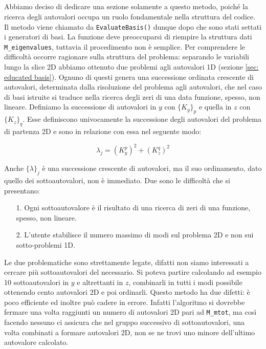 \subsection{}
 Abbiamo deciso di dedicare una sezione solamente a questo metodo, poich\'e la ricerca degli autovalori occupa un ruolo fondamentale nella 
struttura del codice.
 Il metodo viene chiamato da \texttt{EvaluateBasis()} dunque dopo che sono stati settati i generatori di basi. La funzione deve preoccuparsi di 
riempire la struttura dati \texttt{M\_eigenvalues}, tuttavia il procedimento non \`e semplice. 
 Per comprendere le difficolt\`a occorre ragionare sulla struttura del problema: separando le variabili lungo la slice 2D abbiamo ottenuto due 
problemi agli autovalori 1D (sezione \ref{sec: educated basis}). Ognuno di questi genera una successione ordinata crescente di autovalori, 
determinata dalla risoluzione del problema agli autovalori, che nel caso di basi istruite si traduce nella ricerca degli zeri di una data 
funzione, spesso, non lineare. Definiamo la successione di autovalori in $y$ con $\{K_y\}_p$ e quella in $z$ con $\{K_z\}_q$. Esse 
definiscono univocamente la successione degli autovalori del problema di partenza 2D e sono in relazione con essa nel seguente modo:

\begin{equation}
\label{eq: autovalori}
 \lambda_j = (K_y^p)^2 + (K_z^q)^2
\end{equation} 

Anche $\{\lambda\}_j$ \`e una successione crescente di autovalori, ma il suo ordinamento, dato quello dei sottoautovalori, non \`e immediato. 
Due sono le difficolt\`a che si presentano:
\begin{itemize}
\item[1.] Ogni sottoautovalore \`e il risultato di una ricerca di zeri di una funzione, spesso, non lineare.
\item[2.] L'utente stabilisce il numero massimo di modi sul problema 2D e non sui sotto-problemi 1D.
\end{itemize}

Le due problematiche sono strettamente legate, difatti non siamo interessati a cercare pi\`u sottoautovalori del necessario. Si poteva partire 
calcolando ad esempio 10 sottoautovalori in $y$ e altrettanti in $z$, combinarli in tutti i modi possibile ottenendo cento autovalori 2D
e poi ordinarli. Questo metodo ha due difetti: \`e poco efficiente ed inoltre pu\`o cadere in errore. Infatti l'algoritmo si dovrebbe fermare una volta 
raggiunti un numero di autovalori 2D pari ad \texttt{M\_mtot}, ma cos\`i facendo nessuno ci assicura che nel gruppo successivo di sottoautovalori,
una volta combinati a formare autovalori 2D, non se ne trovi uno minore dell'ultimo autovalore calcolato.

